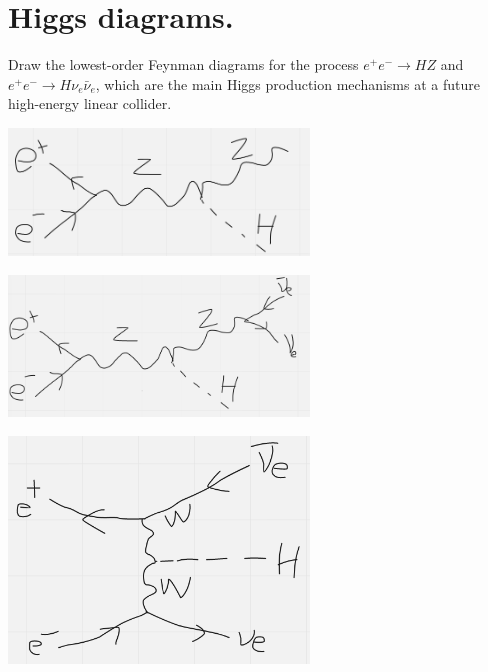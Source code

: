 \section{Higgs diagrams.}

Draw the lowest-order Feynman diagrams for the process $e^+ e^- \to HZ$ and $e^+ e^- \to H \nu_e \bar{\nu}_e$, which are the main Higgs production mechanisms at a future high-energy linear collider.

\begin{center}
    \includegraphics[width=0.6\textwidth]{q8_1.png}

    \includegraphics[width=0.6\textwidth]{q8_2.png}

    \includegraphics[width=0.6\textwidth]{q8_3.png}
\end{center}
